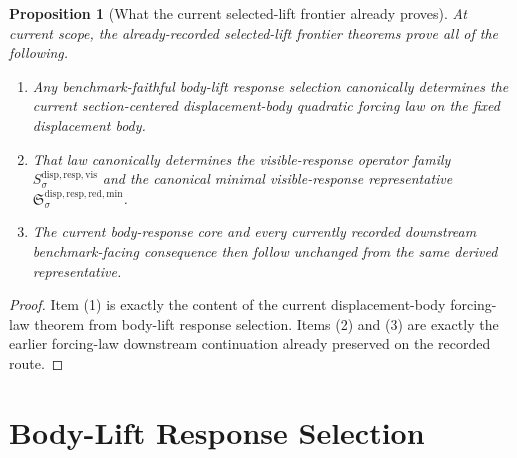 \documentclass[11pt]{article}
\newcommand{\VisibleResponseOperator}[1]{S_{#1}^{\mathrm{disp,resp,vis}}}
\newcommand{\MinimalReducedStructure}{\mathfrak S^{\mathrm{disp,resp,red,min}}}
\newtheorem{proposition}{Proposition}
\begin{document}
\begin{proposition}[What the current selected-lift frontier already proves]
\label{prop:frontier}
At current scope, the already-recorded selected-lift frontier theorems prove all of the following.
\begin{enumerate}
    \item Any benchmark-faithful body-lift response selection canonically determines the current section-centered displacement-body quadratic forcing law on the fixed displacement body.
    \item That law canonically determines the visible-response operator family \(\VisibleResponseOperator{\sigma}\) and the canonical minimal visible-response representative \(\MinimalReducedStructure_{\sigma}\).
    \item The current body-response core and every currently recorded downstream benchmark-facing consequence then follow unchanged from the same derived representative.
\end{enumerate}
\end{proposition}

\begin{proof}
Item (1) is exactly the content of the current displacement-body forcing-law theorem from body-lift response selection. Items (2) and (3) are exactly the earlier forcing-law downstream continuation already preserved on the recorded route.
\end{proof}

\section{Body-Lift Response Selection}
\end{document}
